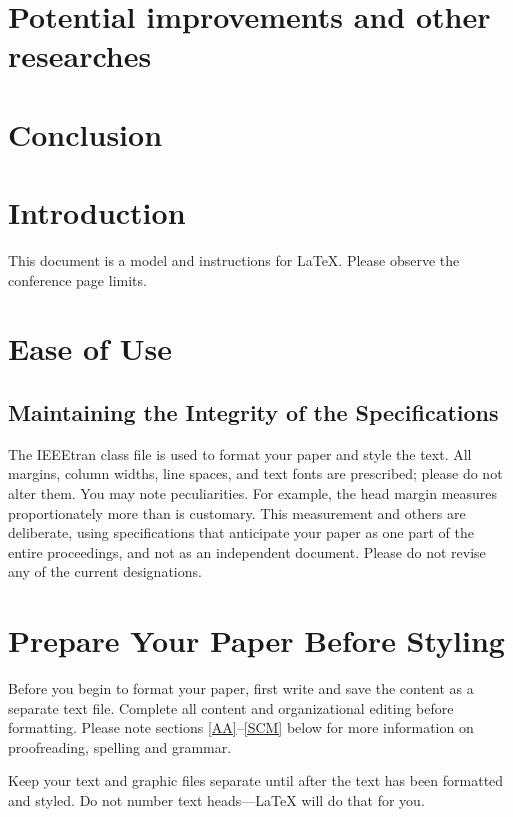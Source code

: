 \documentclass[conference]{IEEEtran}
\begin{document}
\section{Potential improvements and other researches} \label{sec_imporvements}
\section{Conclusion}


\newpage 
\newpage 
\newpage 
\section{Introduction}
This document is a model and instructions for \LaTeX.
Please observe the conference page limits. 

\section{Ease of Use}

\subsection{Maintaining the Integrity of the Specifications}

The IEEEtran class file is used to format your paper and style the text. All margins, 
column widths, line spaces, and text fonts are prescribed; please do not 
alter them. You may note peculiarities. For example, the head margin
measures proportionately more than is customary. This measurement 
and others are deliberate, using specifications that anticipate your paper 
as one part of the entire proceedings, and not as an independent document. 
Please do not revise any of the current designations.

\section{Prepare Your Paper Before Styling}
Before you begin to format your paper, first write and save the content as a 
separate text file. Complete all content and organizational editing before 
formatting. Please note sections \ref{AA}--\ref{SCM} below for more information on 
proofreading, spelling and grammar.

Keep your text and graphic files separate until after the text has been 
formatted and styled. Do not number text heads---{\LaTeX} will do that 
for you.
\end{document}
